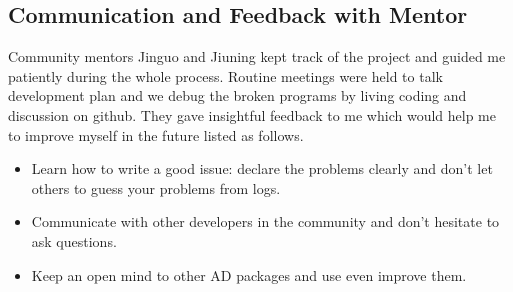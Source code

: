 \subsection{Communication and Feedback with Mentor}
Community mentors Jinguo and Jiuning kept track of the project and guided me patiently during the 
whole process. Routine meetings were held to talk development plan and we debug the broken programs by 
living coding and discussion on github. They gave insightful feedback to me which would help me to improve 
myself in the future listed as follows. 

\begin{itemize}
    \item Learn how to write a good issue: declare the problems clearly and don't let others 
    to guess your problems from logs. 
    \item Communicate with other developers in the community and don't hesitate to ask questions. 
    \item Keep an open mind to other AD packages and use even improve them. 
\end{itemize}
